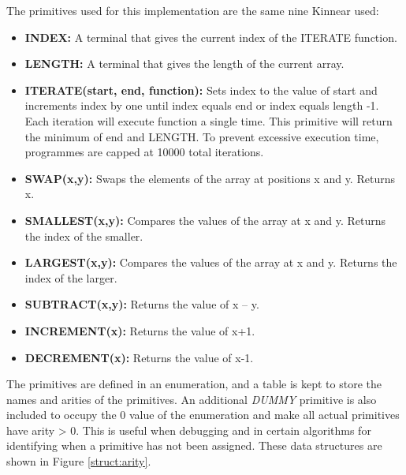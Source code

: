 \documentclass{article}
\begin{document}
        The primitives used for this implementation are the same nine Kinnear used:
        \begin{multicols}{2}
            \begin{itemize}
                \item \textbf{INDEX:} A terminal that gives the current index of the ITERATE function.
                \item \textbf{LENGTH:} A terminal that gives the length of the current array.
                \item \textbf{ITERATE(start, end, function):}  Sets index to the value of start and increments index by one until index equals end or index equals length -1. Each iteration will execute function a single time. This primitive will return the minimum of end and LENGTH. To prevent excessive execution time, programmes are capped at 10000 total iterations.
                \item \textbf{SWAP(x,y):}  Swaps the elements of the array at positions x and y. Returns x.
                \item \textbf{SMALLEST(x,y):} Compares the values of the array at x and y. Returns the index of the smaller.
                \item \textbf{LARGEST(x,y):} Compares the values of the array at x and y. Returns the index of the larger. 
                
                \item \textbf{SUBTRACT(x,y):} Returns the value of x – y.
                \item \textbf{INCREMENT(x):} Returns the value of x+1.
                \item \textbf{DECREMENT(x):} Returns the value of x-1.
                
            \end{itemize}
        \end{multicols}
        
        The primitives are defined in an enumeration, and a table is kept to store the names and arities of the primitives. An additional \textit{DUMMY} primitive is also included to occupy the 0 value of the enumeration and make all actual primitives have arity > 0. This is useful when debugging and in certain algorithms for identifying when a primitive has not been assigned. These data structures are shown in Figure \ref{struct:arity}.
        
\end{document}
